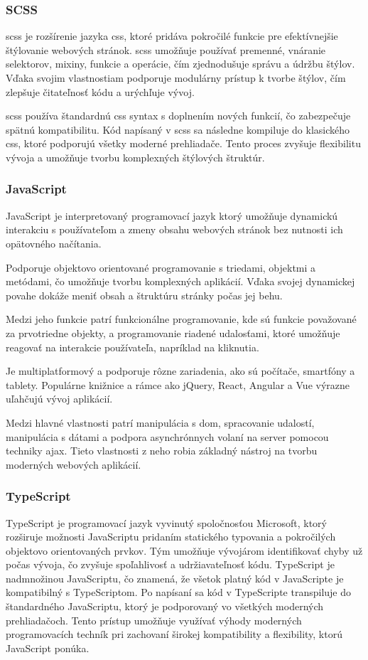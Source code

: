 \subsubsection{SCSS}
\acrfull{scss} je rozšírenie jazyka \acrshort{css}, ktoré pridáva pokročilé funkcie pre efektívnejšie štýlovanie webových stránok. 
\acrshort{scss} umožňuje používať premenné, vnáranie selektorov, mixiny, funkcie a operácie, čím zjednodušuje správu a údržbu štýlov.
 Vďaka svojim vlastnostiam podporuje modulárny prístup k tvorbe štýlov, čím zlepšuje čitateľnosť kódu a urýchľuje vývoj.

 \acrshort{scss} používa štandardnú \acrshort{css} syntax s doplnením nových funkcií, čo zabezpečuje spätnú kompatibilitu.
 Kód napísaný v \acrshort{scss} sa následne kompiluje do klasického \acrshort{css}, ktoré podporujú všetky moderné prehliadače. 
Tento proces zvyšuje flexibilitu vývoja a umožňuje tvorbu komplexných štýlových štruktúr.\cite{scss}
\subsubsection{JavaScript}
JavaScript \cite{JavaScript} je interpretovaný programovací jazyk ktorý umožňuje dynamickú interakciu s používateľom a zmeny obsahu webových stránok bez nutnosti ich opätovného načítania.

Podporuje objektovo orientované programovanie s triedami, objektmi a metódami, čo umožňuje tvorbu komplexných aplikácií. Vďaka svojej dynamickej povahe dokáže meniť obsah a štruktúru stránky počas jej behu.

Medzi jeho funkcie patrí funkcionálne programovanie, kde sú funkcie považované za prvotriedne objekty, a programovanie riadené udalosťami, ktoré umožňuje reagovať na interakcie používateľa, napríklad na kliknutia.

Je multiplatformový a podporuje rôzne zariadenia, ako sú počítače, smartfóny a tablety. Populárne knižnice a rámce ako jQuery, React, Angular a Vue výrazne uľahčujú vývoj aplikácií.

Medzi hlavné vlastnosti patrí manipulácia s \acrfull{dom}, spracovanie udalostí, manipulácia s dátami a podpora asynchrónnych volaní na server pomocou techniky \acrfull{ajax}.
 Tieto vlastnosti z neho robia základný nástroj na tvorbu moderných webových aplikácií.
\subsubsection{TypeScript}
TypeScript \cite{TypeScript} je programovací jazyk vyvinutý spoločnosťou Microsoft, ktorý rozširuje možnosti JavaScriptu pridaním statického typovania a pokročilých objektovo orientovaných prvkov.
 Tým umožňuje vývojárom identifikovať chyby už počas vývoja, čo zvyšuje spoľahlivosť a udržiavateľnosť kódu.
  TypeScript je nadmnožinou JavaScriptu, čo znamená, že všetok platný kód v JavaScripte je kompatibilný s TypeScriptom.
   Po napísaní sa kód v TypeScripte transpiluje do štandardného JavaScriptu, ktorý je podporovaný vo všetkých moderných prehliadačoch. 
   Tento prístup umožňuje využívať výhody moderných programovacích techník pri zachovaní širokej kompatibility a flexibility, ktorú JavaScript ponúka.
